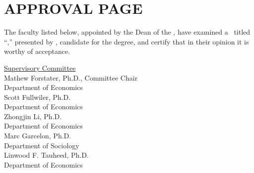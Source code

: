 %
%


\section*{\MakeUppercase{Approval Page}}

\setlength{\baselineskip}{24pt}
The faculty listed below, appointed by the Dean of the \MyUMKCSchool,
 have examined a \MakeLowercase{\ThesisOrDissertation}\ titled
``\MyThesisTitle,''
presented by \MyName, candidate
for the \MyDegree degree, and  certify that in
their opinion it is worthy of acceptance.

\vspace{0.5in}
\setlength{\baselineskip}{5pt}

\begin{center}
\underline{Supervisory Committee}\\

\vspace{0.25in}
Mathew Forstater, Ph.D., Committee Chair\\
Department of Economics\\

\vspace{0.25in}
Scott Fullwiler, Ph.D.\\
Department of Economics\\

\vspace{0.25in}
Zhongjin Li, Ph.D.\\
Department of Economics\\

\vspace{0.25in}
Marc Garcelon, Ph.D.\\
Department of Sociology\\

\vspace{0.25in}
Linwood F. Tauheed, Ph.D.\\
Department of Economics\\

\end{center} \doublespacing \newpage
